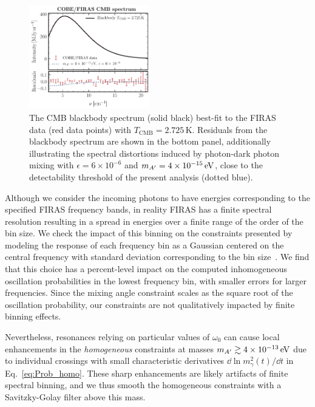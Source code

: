 \documentclass[prd,aps,10pt,nofootinbib,twocolumn,superscriptaddress,preprintnumbers,balancelastpage,longbibliography]{revtex4-1}
\begin{document}
%
\begin{figure}[tbp]
    \centering
    \includegraphics[width=0.47\textwidth]{plots/firas_bb}
    \caption{The CMB blackbody spectrum (solid black) best-fit to the FIRAS data (red data points) with $T_\mathrm{CMB}=2.725$\,K\@. Residuals from the blackbody spectrum are shown in the bottom panel, additionally illustrating the spectral distortions induced by photon-dark photon mixing with $\epsilon=6\times 10^{-6}$ and $\mAp = \SI{4e-15}{\eV}$, close to the detectability threshold of the present analysis (dotted blue).~} 
    \label{fig:firas_blackbody}
\end{figure}
%

Although we consider the incoming photons to have energies corresponding to the specified FIRAS frequency bands, in reality FIRAS has a finite spectral resolution resulting in a spread in energies over a finite range of the order of the bin size. We check the impact of this binning on the constraints presented by modeling the response of each frequency bin as a Gaussian centered on the central frequency with standard deviation corresponding to the bin size~\cite{Fixsen:1998js}. We find that this choice has a percent-level impact on the computed inhomogeneous oscillation probabilities in the lowest frequency bin, with smaller errors for larger frequencies. Since the mixing angle constraint scales as the square root of the oscillation probability, our constraints are not qualitatively impacted by finite binning effects.

Nevertheless, resonances relying on particular values of $\omega_0$ can cause local enhancements in the \emph{homogeneous} constraints at masses $\mAp \gtrsim \SI{4e-13}{\eV}$ due to individual crossings with small characteristic derivatives $\dd\ln m_{\gamma}^{2}(t)/\dd t$ in Eq.~\eqref{eq:Prob_homo}. These sharp enhancements are likely artifacts of finite spectral binning, and we thus smooth the homogeneous constraints with a Savitzky-Golay filter above this mass.
\end{document}
